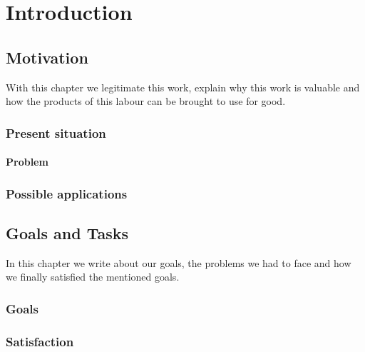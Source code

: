 \chapter{Introduction}
\label{sec:introduction}

\section{Motivation}

With this chapter we legitimate this work, explain why this work is valuable and how the products of this labour can be brought to use for good.

\subsection{Present situation}

\subsubsection{Problem}

\subsection{Possible applications}

\section{Goals and Tasks}

In this chapter we write about our goals, the problems we had to face and how we finally satisfied the mentioned goals.

\subsection{Goals}

\subsection{Satisfaction}
